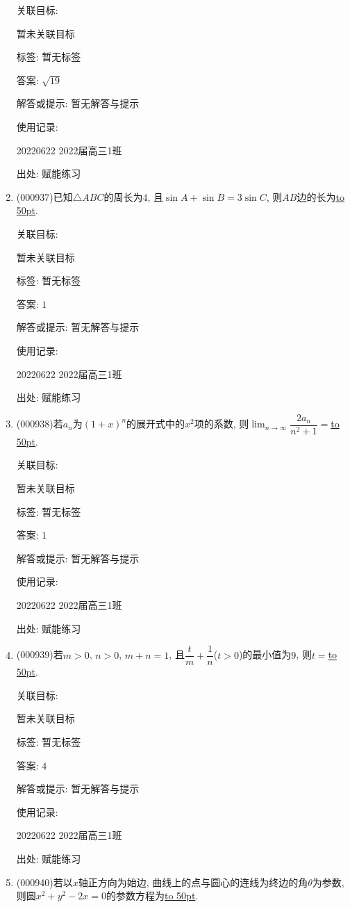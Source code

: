 \documentclass[10pt,a4paper]{article}
\newcommand{\blank}[1]{\underline{\hbox to #1pt{}}}
\begin{document}
\begin{enumerate}[1.]
关联目标:

暂未关联目标



标签: 暂无标签

答案: $\sqrt{19}$

解答或提示: 暂无解答与提示

使用记录:

20220622	2022届高三1班	


出处: 赋能练习
\item { (000937)}已知$\triangle ABC$的周长为$4$, 且$\sin A+\sin B=3 \sin C$, 则$AB$边的长为\blank{50}.


关联目标:

暂未关联目标



标签: 暂无标签

答案: $1$

解答或提示: 暂无解答与提示

使用记录:

20220622	2022届高三1班	


出处: 赋能练习
\item { (000938)}若$a_n$为$(1+x)^n$的展开式中的$x^2$项的系数, 则$\displaystyle\lim_{n\to\infty}\dfrac{2a_n}{n^2+1}=$\blank{50}.


关联目标:

暂未关联目标



标签: 暂无标签

答案: $1$

解答或提示: 暂无解答与提示

使用记录:

20220622	2022届高三1班	


出处: 赋能练习
\item { (000939)}若$m>0$, $n>0$, $m+n=1$, 且$\dfrac t m+\dfrac 1 n$($t>0$)的最小值为$9$, 则$t=$\blank{50}.


关联目标:

暂未关联目标



标签: 暂无标签

答案: $4$

解答或提示: 暂无解答与提示

使用记录:

20220622	2022届高三1班	


出处: 赋能练习
\item { (000940)}若以$x$轴正方向为始边, 曲线上的点与圆心的连线为终边的角$\theta$为参数, 则圆$x^2+y^2-2x=0$的参数方程为\blank{50}.



\end{enumerate}
\end{document}
